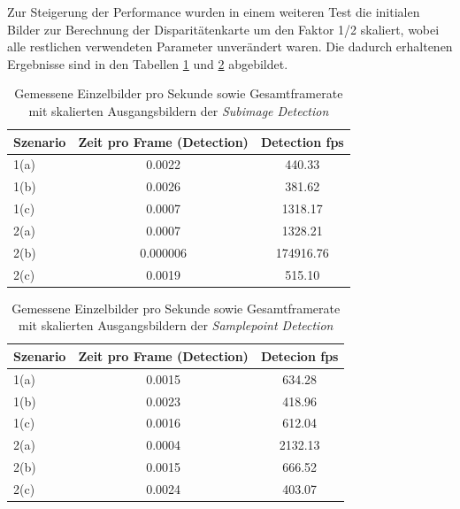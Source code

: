 \noindent
Zur Steigerung der Performance wurden in einem weiteren Test die initialen Bilder zur Berechnung der Disparitätenkarte um den Faktor 1/2 skaliert, wobei alle restlichen verwendeten Parameter unverändert waren. Die dadurch erhaltenen Ergebnisse sind in den Tabellen \ref{tbl:performance_scaled_subimage} und \ref{tbl:performance_scaled_samplepoint} abgebildet.

\begin{table}[h]
\centering
\begin{tabular}{|l|c|c|}
\hline
Szenario & Zeit pro Frame (Detection) & Detection fps \\ \hline\hline
1(a)	 & 0.0022					  & 440.33        \\ \hline
1(b)     & 0.0026                     & 381.62        \\ \hline
1(c)     & 0.0007                     & 1318.17       \\ \hline\hline
2(a)     & 0.0007                     & 1328.21       \\ \hline
2(b)     & 0.000006                   & 174916.76     \\ \hline
2(c)     & 0.0019                     & 515.10    \\ \hline
\end{tabular}
\caption{Gemessene Einzelbilder pro Sekunde sowie Gesamtframerate mit skalierten Ausgangsbildern der \emph{Subimage Detection}}
\label{tbl:performance_scaled_subimage}
\end{table}

\begin{table}[h]
\centering
\begin{tabular}{|l|c|c|}
\hline
Szenario & Zeit pro Frame (Detection) & Detecion fps \\ \hline\hline
1(a)	 & 0.0015				      & 634.28		 \\ \hline
1(b)     & 0.0023                     & 418.96   	 \\ \hline
1(c)     & 0.0016                     & 612.04       \\ \hline\hline
2(a)     & 0.0004                     & 2132.13      \\ \hline
2(b)     & 0.0015                     & 666.52       \\ \hline
2(c)     & 0.0024                     & 403.07       \\ \hline
\end{tabular}
\caption{Gemessene Einzelbilder pro Sekunde sowie Gesamtframerate mit skalierten Ausgangsbildern der \emph{Samplepoint Detection}}
\label{tbl:performance_scaled_samplepoint}
\end{table}

